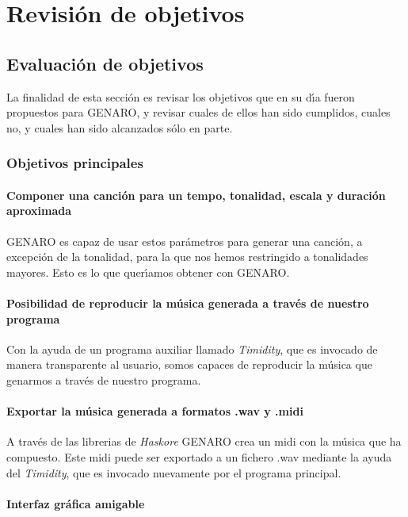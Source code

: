 ﻿\chapter {Revisi\'on de objetivos}
\section{Evaluaci\'on de objetivos}
La finalidad de esta secci\'on es revisar los objetivos que en su d\'\i a fueron propuestos para GENARO, y revisar cuales de ellos han sido cumplidos, cuales no, y cuales han sido alcanzados s\'olo en parte.

\subsection{Objetivos principales}

\subsubsection{Componer una canci\'on para un tempo, tonalidad, escala y duraci\'on aproximada}

GENARO es capaz de usar estos par\'ametros para generar una canci\'on, a excepci\'on de la tonalidad, para la que nos hemos restringido a tonalidades mayores. Esto es lo que quer\'\i amos obtener con GENARO.

\subsubsection{Posibilidad de reproducir la m\'usica generada a trav\'es de nuestro programa}

Con la ayuda de un programa auxiliar llamado \emph{Timidity}, que es invocado de manera transparente al usuario, somos capaces de reproducir la m\'usica que genarmos a trav\'es de nuestro programa.

\subsubsection{Exportar la m\'usica generada a formatos .wav y .midi}

A trav\'es de las librerias de \emph{Haskore} GENARO crea un midi con la m\'usica que ha compuesto. Este midi puede ser exportado a un fichero .wav mediante la ayuda del \emph{Timidity}, que es invocado nuevamente por el programa principal.

\subsubsection{Interfaz gr\'afica amigable}

